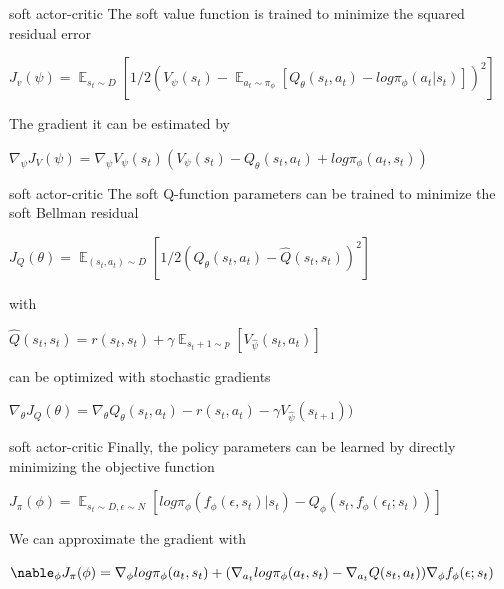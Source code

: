 \documentclass{beamer}
\DeclareMathOperator{\EX}{\mathbb{E}}%
\begin{document}
\begin{frame}{soft actor-critic }
    The soft value function is trained to minimize the squared residual error\\
    \begin{center}
        $J_v(\psi) = \EX_{s_t \sim D}[1/2(V_\psi(s_t) - \EX_{a_t \sim \pi_\phi}[Q_\theta(s_t,a_t) - log\pi_\phi(a_t|s_t)])^2]$\\
    \end{center}
    The gradient it can be estimated by\\
    \begin{center}
        $\nabla_\psi J_V(\psi) = \nabla_\psi V_\psi(s_t)(V_\psi(s_t) - Q_\theta(s_t,a_t) + log\pi_\phi(a_t,s_t))$\\
    \end{center}
\end{frame}

\begin{frame}{soft actor-critic}
    The soft Q-function parameters can be trained to minimize the soft Bellman residual\\
    \begin{center}
        $J_Q(\theta) = \EX_{(s_t,a_t) \sim D} [1/2(Q_\theta(s_t,a_t) - \hat{Q}(s_t,s_t))^2]$\\
    \end{center}
    with\\
    \begin{center}
        $\hat{Q}(s_t,s_t) = r(s_t,s_t) + \gamma\EX_{s_t+1 \sim p}[ {V_\hat{\psi}(s_t,a_t)} ]$\\
    \end{center}
    can be optimized with stochastic gradients\\
    \begin{center}
        $\nabla_\theta J_Q(\theta) = \nabla_\theta Q_\theta(s_t,a_t) - r(s_t,a_t) - {\gamma V_\hat{\psi}(s_{t+1})})$\\
    \end{center}
\end{frame}

\begin{frame}{soft actor-critic}
    Finally, the policy parameters can be learned by directly minimizing the objective function\\
    \begin{center}
        $J_\pi(\phi) = \EX_{s_t \sim D, \epsilon \sim N} [log \pi_\phi(f_\phi(\epsilon,s_t)|s_t) - Q_\phi (s_t,f_\phi(\epsilon_t;s_t))]$\\
    \end{center}
    We can approximate the gradient with\\
    \begin{center}
        $\nable_\phi J_\pi(\phi) = \nabla_\phi log\pi_\phi(a_t,s_t) \\
        + (\nabla_{a_t}log\pi_\phi(a_t,s_t) - \nabla_{a_t}Q(s_t,a_t)) \nabla_\phi f_\phi(\epsilon;s_t) $ \\
        
    \end{center}
\end{frame}
\end{document}
